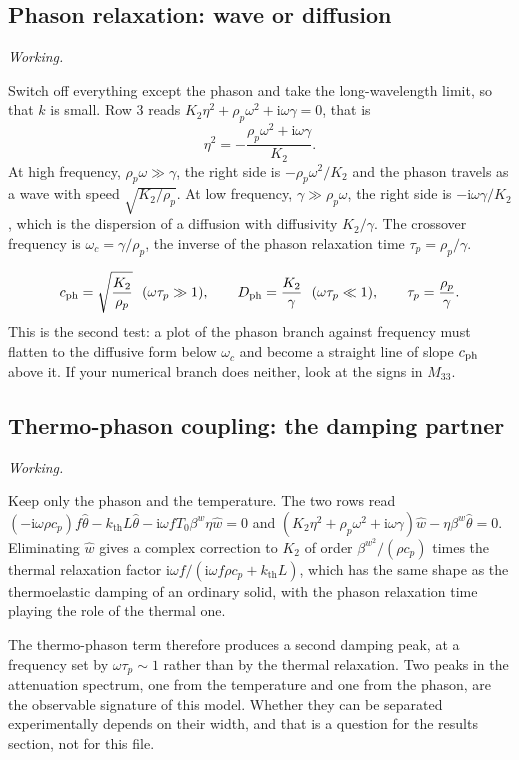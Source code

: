 \documentclass[11pt,a4paper]{article}
\newif\ifshowworked \showworkedtrue
\newenvironment{worked}{\ifshowworked\par\smallskip\noindent\textit{Working.}\par\else\setbox0\vbox\bgroup\fi}{\ifshowworked\par\smallskip\else\egroup\fi}
\newcommand{\ii}{\mathrm{i}}
\newcommand{\bw}{\hat w}
\newcommand{\bt}{\hat\theta}
\newcommand{\kB}{k_{\mathrm{th}}}
\newcommand{\bwth}{\beta^{w}}
\begin{document}
\subsection{Phason relaxation: wave or diffusion}

\begin{worked}
Switch off everything except the phason and take the long-wavelength limit, so that $k$ is small. Row 3 reads
$K_2\eta^2+\rho_p\omega^2+\ii\omega\gamma=0$, that is
\[
\eta^2=-\frac{\rho_p\omega^2+\ii\omega\gamma}{K_2}.
\]
At high frequency, $\rho_p\omega\gg\gamma$, the right side is $-\rho_p\omega^2/K_2$ and the phason travels as
a wave with speed $\sqrt{K_2/\rho_p}$. At low frequency, $\gamma\gg\rho_p\omega$, the right side is
$-\ii\omega\gamma/K_2$, which is the dispersion of a diffusion with diffusivity $K_2/\gamma$. The crossover
frequency is $\omega_c=\gamma/\rho_p$, the inverse of the phason relaxation time $\tau_p=\rho_p/\gamma$.
\end{worked}

\noindent
\begin{equation}\label{eq:phasonspeed}
c_{\rm ph}=\sqrt{\frac{K_2}{\rho_p}}\ \ (\omega\tau_p\gg1),\qquad
D_{\rm ph}=\frac{K_2}{\gamma}\ \ (\omega\tau_p\ll1),\qquad \tau_p=\frac{\rho_p}{\gamma}.
\end{equation}
This is the second test: a plot of the phason branch against frequency must flatten to the diffusive form
below $\omega_c$ and become a straight line of slope $c_{\rm ph}$ above it. If your numerical branch does
neither, look at the signs in $M_{33}$.

\subsection{Thermo-phason coupling: the damping partner}

\begin{worked}
Keep only the phason and the temperature. The two rows read
$(-\ii\omega\rho c_p)f\bt-\kB L\bt-\ii\omega fT_0\bwth\eta\bw=0$ and
$(K_2\eta^2+\rho_p\omega^2+\ii\omega\gamma)\bw-\eta\bwth\bt=0$. Eliminating $\bw$ gives a complex correction
to $K_2$ of order $\bwth^2/(\rho c_p)$ times the thermal relaxation factor
$\ii\omega f/(\ii\omega f\rho c_p+\kB L)$, which has the same shape as the thermoelastic damping of an
ordinary solid, with the phason relaxation time playing the role of the thermal one.
\end{worked}

\noindent The thermo-phason term therefore produces a second damping peak, at a frequency set by
$\omega\tau_p\sim1$ rather than by the thermal relaxation. Two peaks in the attenuation spectrum, one from
the temperature and one from the phason, are the observable signature of this model. Whether they can be
separated experimentally depends on their width, and that is a question for the results section, not for
this file.
\end{document}
